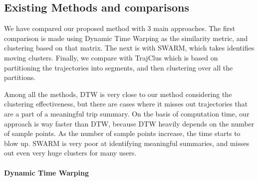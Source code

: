 \subsection{Existing Methods and comparisons} 

We have compared our proposed method with 3 main approaches. The first comparison is made using Dynamic Time Warping as the similarity metric, and clustering based on that matrix. The next is with SWARM, which takes identifies moving clusters. Finally, we compare with TrajClus which is based on partitioning the trajectories into segments, and then clustering over all the partitions. 

Among all the methods, DTW is very close to our method considering the clustering effectiveness, but there are cases where it misses out trajectories that are a part of a meaningful trip summary. On the basis of computation time, our approach is way faster than DTW, because DTW heavily depends on the number of sample points. As the number of sample points increase, the time starts to blow up. 
SWARM is very poor at identifying meaningful summaries, and misses out even very huge clusters for many users. 

\paragraph{Dynamic Time Warping}


